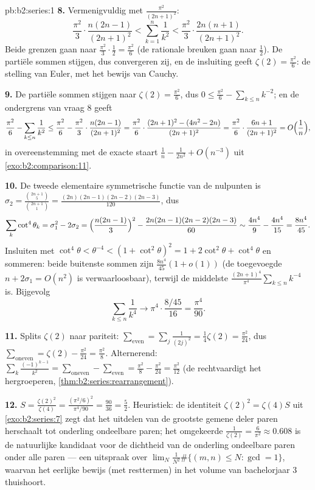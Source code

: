 \begin{solution}{pb:b2:series:1}
\textbf{8.} Vermenigvuldig met $\frac{\pi^2}{(2n+1)^2}$:
\[
\frac{\pi^2}{3}\cdot\frac{n(2n-1)}{(2n+1)^2}
< \sum_{k=1}^{n}\frac1{k^2} <
\frac{\pi^2}{3}\cdot\frac{2n(n+1)}{(2n+1)^2}.
\]
Beide grenzen gaan naar $\frac{\pi^2}3\cdot\frac12 =
\frac{\pi^2}6$ (de rationale breuken gaan naar $\frac12$). De
partiële sommen stijgen, dus convergeren zij, en de insluiting
geeft $\zeta(2) = \frac{\pi^2}6$: de stelling van Euler, met het
bewijs van Cauchy.

\textbf{9.} De partiële sommen stijgen naar $\zeta(2) =
\frac{\pi^2}6$, dus $0 \leq \frac{\pi^2}6 - \sum_{k\leq
n}k^{-2}$; en de ondergrens van vraag 8 geeft
\[
\frac{\pi^2}6 - \sum_{k\leq n}\frac1{k^2}
\leq \frac{\pi^2}6 - \frac{\pi^2}3\cdot\frac{n(2n-1)}{(2n+1)^2}
= \frac{\pi^2}6\cdot\frac{(2n+1)^2 - (4n^2 -
2n)}{(2n+1)^2}
= \frac{\pi^2}6\cdot\frac{6n + 1}{(2n+1)^2}
= O\Bigl(\frac1n\Bigr),
\]
in overeenstemming met de exacte staart $\frac1n - \frac1{2n^2} +
O(n^{-3})$ uit \cref{exo:b2:comparison:11}.

\textbf{10.} De tweede elementaire symmetrische functie van de
nulpunten is $\sigma_2 = \frac{\binom{2n+1}5}{\binom{2n+1}1} =
\frac{(2n)(2n-1)(2n-2)(2n-3)}{120}$, dus
\[
\sum_k\cot^4\theta_k = \sigma_1^2 - 2\sigma_2
= \Bigl(\frac{n(2n-1)}3\Bigr)^2 -
\frac{2n(2n-1)(2n-2)(2n-3)}{60}
\sim \frac{4n^4}9 - \frac{4n^4}{15} = \frac{8n^4}{45}.
\]
Insluiten met $\cot^4\theta < \theta^{-4} < (1 + \cot^2\theta)^2 =
1 + 2\cot^2\theta + \cot^4\theta$ en sommeren: beide buitenste
sommen zijn $\frac{8n^4}{45}(1 + o(1))$ (de toegevoegde $n +
2\sigma_1 = O(n^2)$ is verwaarloosbaar), terwijl de middelste
$\frac{(2n+1)^4}{\pi^4}\sum_{k\leq n}k^{-4}$ is. Bijgevolg
\[
\sum_{k\leq n}\frac1{k^4} \longrightarrow
\pi^4\cdot\frac{8/45}{16} = \frac{\pi^4}{90}.
\]

\textbf{11.} Splits $\zeta(2)$ naar pariteit: $\sum_{\text{even}} =
\sum_j\frac{1}{(2j)^2} = \frac14\zeta(2) = \frac{\pi^2}{24}$, dus
$\sum_{\text{oneven}} = \zeta(2) - \frac{\pi^2}{24} =
\frac{\pi^2}8$. Alternerend: $\sum_k\frac{(-1)^{k-1}}{k^2} =
\sum_{\text{oneven}} - \sum_{\text{even}} = \frac{\pi^2}8 -
\frac{\pi^2}{24} = \frac{\pi^2}{12}$ (de 
rechtvaardigt het hergroeperen,
\cref{thm:b2:series:rearrangement}).

\textbf{12.} $S = \frac{\zeta(2)^2}{\zeta(4)} =
\frac{(\pi^2/6)^2}{\pi^4/90} = \frac{90}{36} = \frac52$.
Heuristiek: de identiteit $\zeta(2)^2 = \zeta(4)S$ uit
\cref{exo:b2:series:7} zegt dat het uitdelen van de grootste gemene
deler paren herschaalt tot onderling ondeelbare paren; het
omgekeerde $\frac1{\zeta(2)} = \frac6{\pi^2} \approx 0.608$ is de
natuurlijke kandidaat voor de dichtheid van de onderling
ondeelbare paren onder alle paren --- een uitspraak over $\lim_N
\frac{1}{N^2}\#\{(m,n) \leq N : \gcd = 1\}$, waarvan het eerlijke
bewijs (met resttermen) in het volume van bachelorjaar 3 thuishoort.


\end{solution}
